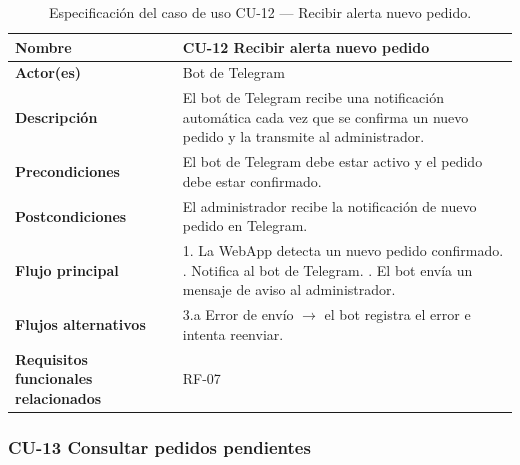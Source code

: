\begin{table}[H]
\centering
\small
\begin{tabular}{|m{}|m{}|}
\hline
\textbf{Nombre} & CU-12 Recibir alerta nuevo pedido \\ \hline
\textbf{Actor(es)} & Bot de Telegram \\ \hline
\textbf{Descripción} & El bot de Telegram recibe una notificación automática cada vez que se confirma un nuevo pedido y la transmite al administrador. \\ \hline
\textbf{Precondiciones} & El bot de Telegram debe estar activo y el pedido debe estar confirmado. \\ \hline
\textbf{Postcondiciones} & El administrador recibe la notificación de nuevo pedido en Telegram. \\ \hline
\textbf{Flujo principal} & 1. La WebApp detecta un nuevo pedido confirmado. \newline 2. Notifica al bot de Telegram. \newline 3. El bot envía un mensaje de aviso al administrador. \\ \hline
\textbf{Flujos alternativos} & 3.a Error de envío $\rightarrow$ el bot registra el error e intenta reenviar. \\ \hline
\textbf{Requisitos funcionales relacionados} & RF-07 \\ \hline
\end{tabular}
\caption{Especificación del caso de uso CU-12 — Recibir alerta nuevo pedido.}
\end{table}

\subsubsection{CU-13 Consultar pedidos pendientes}

